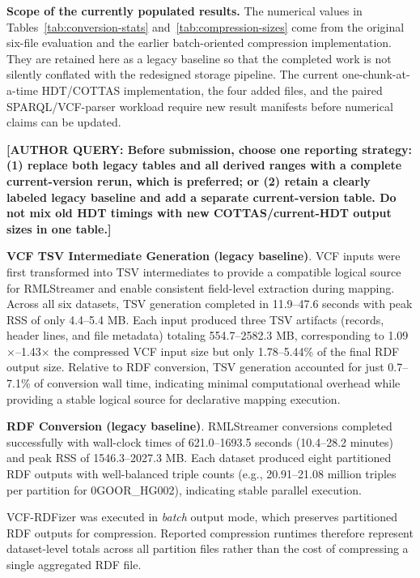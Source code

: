 \documentclass[pdflatex,sn-mathphys-num]{sn-jnl}%
\newenvironment{revision}{\begingroup\color{revisionblue}}{\endgroup}%
\newcommand{\authorquery}[1]{%
  \par\smallskip\noindent
  {\color{queryorange}\textbf{[AUTHOR QUERY: #1]}}%
  \par\smallskip
}%
\theoremstyle{thmstyleone}%
\theoremstyle{thmstyletwo}%
\theoremstyle{thmstylethree}%
\begin{document}
\begin{revision}
\textbf{Scope of the currently populated results.}
The numerical values in Tables~\ref{tab:conversion-stats} and~\ref{tab:compression-sizes} come from the original six-file evaluation and the earlier batch-oriented compression implementation. They are retained here as a legacy baseline so that the completed work is not silently conflated with the redesigned storage pipeline. The current one-chunk-at-a-time HDT/COTTAS implementation, the four added files, and the paired SPARQL/VCF-parser workload require new result manifests before numerical claims can be updated.
\end{revision}
\authorquery{Before submission, choose one reporting strategy: (1) replace both legacy tables and all derived ranges with a complete current-version rerun, which is preferred; or (2) retain a clearly labeled legacy baseline and add a separate current-version table. Do not mix old HDT timings with new COTTAS/current-HDT output sizes in one table.}

\textbf{VCF TSV Intermediate Generation (legacy baseline)}.
VCF inputs were first transformed into TSV intermediates to provide a compatible logical source for RMLStreamer and enable consistent field-level extraction during mapping.
Across all six datasets, TSV generation completed in 11.9--47.6 seconds with peak RSS of only 4.4--5.4 MB.
Each input produced three TSV artifacts (records, header lines, and file metadata) totaling 554.7--2582.3 MB, corresponding to 1.09$\times$--1.43$\times$ the compressed VCF input size but only 1.78--5.44\% of the final RDF output size.
Relative to RDF conversion, TSV generation accounted for just 0.7--7.1\% of conversion wall time, indicating minimal computational overhead while providing a stable logical source for declarative mapping execution.


\textbf{RDF Conversion (legacy baseline)}.
RMLStreamer conversions completed successfully with wall-clock times of 621.0--1693.5 seconds (10.4--28.2 minutes) and peak RSS of 1546.3--2027.3 MB.
Each dataset produced eight partitioned RDF outputs with well-balanced triple counts (e.g., 20.91--21.08 million triples per partition for 0GOOR\_HG002), indicating stable parallel execution.

VCF-RDFizer was executed in \textit{batch} output mode, which preserves partitioned RDF outputs for compression.
Reported compression runtimes therefore represent dataset-level totals across all partition files rather than the cost of compressing a single aggregated RDF file.
\end{document}
